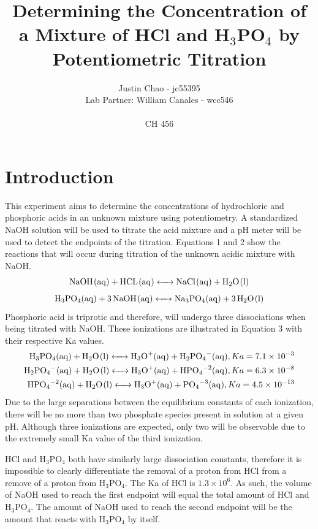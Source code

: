 \documentclass{article}
\begin{document}
\title {Determining the Concentration of a Mixture of HCl and H$_3$PO$_4$ by
Potentiometric Titration}
\author {Justin Chao - jc55395 \\ Lab Partner: William Canales - wcc546 \\ \\ CH 456}
\maketitle


\newpage
\doublespacing


\section {Introduction}
This experiment aims to determine the concentrations of hydrochloric and
phosphoric acids in an unknown mixture using potentiometry. A standardized NaOH
solution will be used to titrate the acid mixture and a pH meter will be used to
detect the endpoints of the titration. Equations 1 and 2 show the reactions that will
occur during titration of the unknown acidic mixture with NaOH.
\begin{equation}
        \ce {NaOH(aq) + HCL(aq) <-> NaCl(aq) + H2O(l)}
\end{equation}
\begin{equation}
        \ce {H3PO4(aq) + 3NaOH(aq) <-> Na3PO4(aq) + 3H2O(l)}
\end{equation}
Phosphoric acid is triprotic and therefore, will undergo three dissociations
when being titrated with NaOH. These ionizations are illustrated in Equation 3
with their respective Ka values.
\begin{equation}
\begin{aligned}
        \ce {H3PO4(aq) + H2O(l) <-> H3O+(aq) + H2PO4-(aq)},  Ka = 7.1\times10^{-3}\\
        \ce {H2PO4-(aq) + H2O(l) <-> H3O+(aq) + HPO4^{-2}(aq)},  Ka = 6.3\times10^{-8} \\
        \ce {HPO4^{-2}(aq) + H2O(l) <-> H3O+(aq) + PO4^{-3}(aq)}, Ka = 4.5\times10^{-13}
\end{aligned}
\end{equation}
Due to the large separations between the equilibrium constants of each
ionization, there will be no more than two phosphate species present in solution
at a given pH. Although three ionizations are expected, only two will be
observable due to the extremely small Ka value of the third ionization.

HCl and H$_3$PO$_4$ both have similarly large dissociation constants, therefore
it is impossible to clearly differentiate the removal of a proton from HCl from
a remove of a proton from H$_3$PO$_4$. The Ka of HCl is $1.3\times10^6$. As
such, the volume of NaOH used to reach the first endpoint will equal the total
amount of HCl and H$_3$PO$_4$. The amount of NaOH used to reach the second
endpoint will be the amount that reacts with H$_3$PO$_4$ by itself.
\cite{lab_man}
\end{document}
